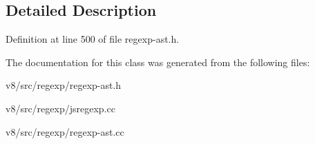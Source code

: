 \subsection{Detailed Description}


Definition at line 500 of file regexp-\/ast.\+h.



The documentation for this class was generated from the following files\+:\begin{DoxyCompactItemize}
\item 
v8/src/regexp/regexp-\/ast.\+h\item 
v8/src/regexp/jsregexp.\+cc\item 
v8/src/regexp/regexp-\/ast.\+cc\end{DoxyCompactItemize}
